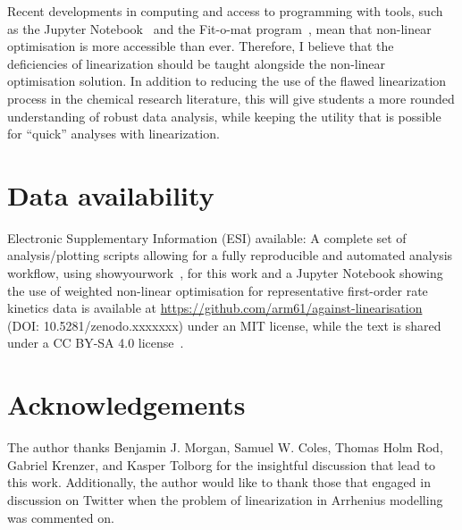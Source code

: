 \documentclass[journal=jacsat,manuscript=article]{achemso}
\begin{document}
Recent developments in computing and access to programming with tools, such as the Jupyter Notebook~\cite{kluyver_jupyter_2016} and the Fit-o-mat program~\cite{mglich_open_2018}, mean that non-linear optimisation is more accessible than ever. 
Therefore, I believe that the deficiencies of linearization should be taught alongside the non-linear optimisation solution. 
In addition to reducing the use of the flawed linearization process in the chemical research literature, this will give students a more rounded understanding of robust data analysis, while keeping the utility that is possible for ``quick'' analyses with linearization.

\section*{Data availability}

Electronic Supplementary Information (ESI) available: A complete set of analysis/plotting scripts allowing for a fully reproducible and automated analysis workflow, using showyourwork~\cite{luger_showyourwork_2021}, for this work and a Jupyter Notebook showing the use of weighted non-linear optimisation for representative first-order rate kinetics data is available at \url{https://github.com/arm61/against-linearisation} (DOI: 10.5281/zenodo.xxxxxxx) under an MIT license, while the text is shared under a CC BY-SA 4.0 license~\cite{mccluskey_github_2023}. \\

\section*{Acknowledgements}

The author thanks Benjamin J. Morgan, Samuel W. Coles, Thomas Holm Rod, Gabriel Krenzer, and Kasper Tolborg for the insightful discussion that lead to this work. 
Additionally, the author would like to thank those that engaged in discussion on Twitter when the problem of linearization in Arrhenius modelling was commented on. 


\end{document}
